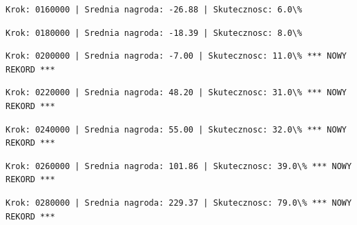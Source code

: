 \documentclass[11pt]{article}
\begin{document}
    
    
    \begin{Verbatim}[commandchars=\\\{\}]
Krok: 0160000 | Srednia nagroda: -26.88 | Skutecznosc: 6.0\%

    \end{Verbatim}

    
    
    \begin{Verbatim}[commandchars=\\\{\}]
Krok: 0180000 | Srednia nagroda: -18.39 | Skutecznosc: 8.0\%

    \end{Verbatim}

    
    
    \begin{Verbatim}[commandchars=\\\{\}]
Krok: 0200000 | Srednia nagroda: -7.00 | Skutecznosc: 11.0\% *** NOWY REKORD ***

    \end{Verbatim}

    
    
    \begin{Verbatim}[commandchars=\\\{\}]
Krok: 0220000 | Srednia nagroda: 48.20 | Skutecznosc: 31.0\% *** NOWY REKORD ***

    \end{Verbatim}

    
    
    \begin{Verbatim}[commandchars=\\\{\}]
Krok: 0240000 | Srednia nagroda: 55.00 | Skutecznosc: 32.0\% *** NOWY REKORD ***

    \end{Verbatim}

    
    
    \begin{Verbatim}[commandchars=\\\{\}]
Krok: 0260000 | Srednia nagroda: 101.86 | Skutecznosc: 39.0\% *** NOWY REKORD ***

    \end{Verbatim}

    
    
    \begin{Verbatim}[commandchars=\\\{\}]
Krok: 0280000 | Srednia nagroda: 229.37 | Skutecznosc: 79.0\% *** NOWY REKORD ***

    \end{Verbatim}
\end{document}
